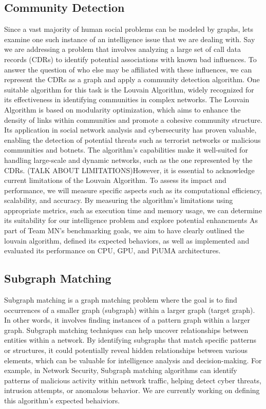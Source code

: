 \documentclass[letterpaper, 10pt]{article}
\begin{document}
\begin{multicols}{2}
        \subsection{Community Detection}\label{section:communityDetection}
            Since a vast majority of human social problems can be modeled by graphs, lets examine one such instance of an intelligence issue that we are dealing with. Say we are addressing a problem that involves analyzing a large set of call data records (CDRs) to identify potential associations with known bad influences. To answer the question of who else may be affiliated with these influences, we can represent the CDRs as a graph and apply a community detection algorithm. One suitable algorithm for this task is the Louvain Algorithm, widely recognized for its effectiveness in identifying communities in complex networks. The Louvain Algorithm is based on modularity optimization, which aims to enhance the density of links within communities and promote a cohesive community structure. Its application in social network analysis and cybersecurity has proven valuable, enabling the detection of potential threats such as terrorist networks or malicious communities and botnets. The algorithm's capabilities make it well-suited for handling large-scale and dynamic networks, such as the one represented by the CDRs.  (TALK ABOUT LIMITATIONS)However, it is essential to acknowledge current limitations of the Louvain Algorithm. To assess its impact and performance, we will measure specific aspects such as its computational efficiency, scalability, and accuracy. By measuring the algorithm's limitations using appropriate metrics, such as execution time and memory usage, we can determine its suitability for our intelligence problem and explore potential enhancments 
            As part of Team MN's benchmarking goals, we aim to have clearly outlined the louvain algorithm, defined its expected behaviors, as well as implemented and evaluated its performance on CPU, GPU, and PiUMA architectures. 
            
        \subsection{Subgraph Matching}\label{section:subgraphMatching}
            Subgraph matching is a graph matching problem where the goal is to find occurrences of a smaller graph (subgraph) within a larger graph (target graph). In other words, it involves finding instances of a pattern graph within a larger graph. Subgraph matching techniques can help uncover relationships between entities within a network. By identifying subgraphs that match specific patterns or structures, it could potentially reveal hidden relationships between various elements, which can be valuable for intelligence analysis and decision-making. For example, in Network Security, Subgraph matching algorithms can identify patterns of malicious activity within network traffic, helping detect cyber threats, intrusion attempts, or anomalous behavior. We are currently working on defining this algorithm's expected behaiviors. 


\end{multicols}
\end{document}
